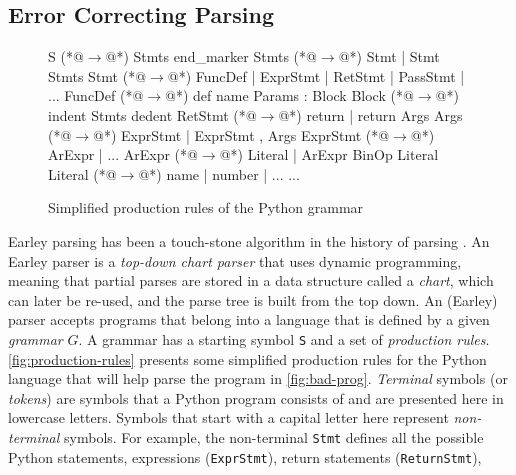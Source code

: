 \subsection{Error Correcting Parsing}
\label{sec:overview:ec-parsing}

\begin{figure}[t]
\begin{ecode}
S        (*@$\rightarrow$@*) Stmts end_marker
Stmts    (*@$\rightarrow$@*) Stmt \n | Stmt \n Stmts
Stmt     (*@$\rightarrow$@*) FuncDef | ExprStmt | RetStmt | PassStmt | ...
FuncDef  (*@$\rightarrow$@*) def name Params : Block
Block    (*@$\rightarrow$@*) \n indent Stmts dedent
RetStmt  (*@$\rightarrow$@*) return | return Args
Args     (*@$\rightarrow$@*) ExprStmt | ExprStmt , Args
ExprStmt (*@$\rightarrow$@*) ArExpr | ...
ArExpr   (*@$\rightarrow$@*) Literal | ArExpr BinOp Literal
Literal  (*@$\rightarrow$@*) name | number | ...
...
\end{ecode}
\caption{Simplified production rules of the Python grammar}
\label{fig:production-rules}
\end{figure}

 Earley parsing has been a touch-stone
algorithm in the history of parsing \citep{Earley_1970}. An Earley parser is a
\emph{top-down chart parser} that uses dynamic programming, meaning that partial
parses are stored in a data structure called a \emph{chart}, which can later be
re-used, and the parse tree is built from the top down. An (Earley) parser
accepts programs that belong into a language that is defined by a given
\emph{grammar} $G$. A grammar has a starting symbol \texttt{S} and a set of
\emph{production rules}. \autoref{fig:production-rules} presents some simplified
production rules for the Python language that will help parse the program in
\autoref{fig:bad-prog}. \emph{Terminal} symbols (or \emph{tokens}) are symbols
that a Python program consists of and are presented here in lowercase letters.
Symbols that start with a capital letter here represent \emph{non-terminal}
symbols. For example, the non-terminal \texttt{Stmt} defines all the possible
Python statements, \ie expressions (\texttt{ExprStmt}), return statements
(\texttt{ReturnStmt}), \etc


%

